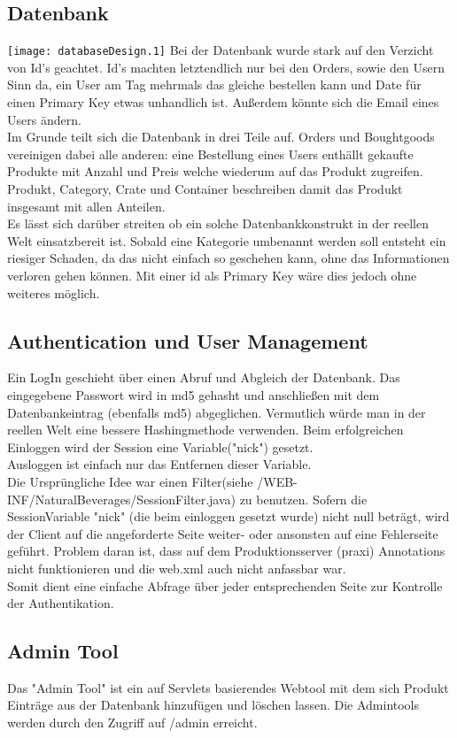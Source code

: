 \documentclass[a4paper, 11pt]{article}
\begin{document}
\subsection{Datenbank}
\texttt{[image: databaseDesign.1]}
Bei der Datenbank wurde stark auf den Verzicht von Id's geachtet. Id's machten letztendlich nur bei den Orders, sowie den Usern Sinn da, ein User am Tag mehrmals das gleiche bestellen kann und Date für einen Primary Key etwas unhandlich ist. Außerdem könnte sich die Email eines Users ändern. \\
Im Grunde teilt sich die Datenbank in drei Teile auf. Orders und Boughtgoods vereinigen dabei alle anderen: eine Bestellung eines Users enthällt gekaufte Produkte mit Anzahl und Preis welche wiederum auf das Produkt zugreifen. Produkt, Category, Crate und Container beschreiben damit das Produkt insgesamt mit allen Anteilen. \\
Es lässt sich darüber streiten ob ein solche Datenbankkonstrukt in der reellen Welt einsatzbereit ist. Sobald eine Kategorie umbenannt werden soll entsteht ein riesiger Schaden, da das nicht einfach so geschehen kann, ohne das Informationen verloren gehen können. Mit einer id als Primary Key wäre dies jedoch ohne weiteres möglich.

\subsection{Authentication und User Management}
Ein LogIn geschieht über einen Abruf und Abgleich der Datenbank. Das eingegebene Passwort wird in md5 gehasht und anschließen mit dem Datenbankeintrag (ebenfalls md5) abgeglichen. Vermutlich würde man in der reellen Welt eine bessere Hashingmethode verwenden. Beim erfolgreichen Einloggen wird der Session eine Variable("nick") gesetzt. \\
Ausloggen ist einfach nur das Entfernen dieser Variable.\\
Die Ursprüngliche Idee war einen Filter(siehe /WEB-INF/NaturalBeverages/SessionFilter.java) zu benutzen. Sofern die SessionVariable "nick" (die beim einloggen gesetzt wurde) nicht null beträgt, wird der Client auf die angeforderte Seite weiter- oder ansonsten auf eine Fehlerseite geführt. Problem daran ist, dass auf dem Produktionsserver (praxi) Annotations nicht funktionieren und die web.xml auch nicht anfassbar war. \\
Somit dient eine einfache Abfrage über jeder entsprechenden Seite zur Kontrolle der Authentikation.  

\subsection{Admin Tool}
Das "Admin Tool" ist ein auf Servlets basierendes Webtool mit dem sich Produkt Einträge aus der Datenbank hinzufügen und löschen lassen. Die Admintools werden durch den Zugriff auf /admin erreicht. 
\end{document}
